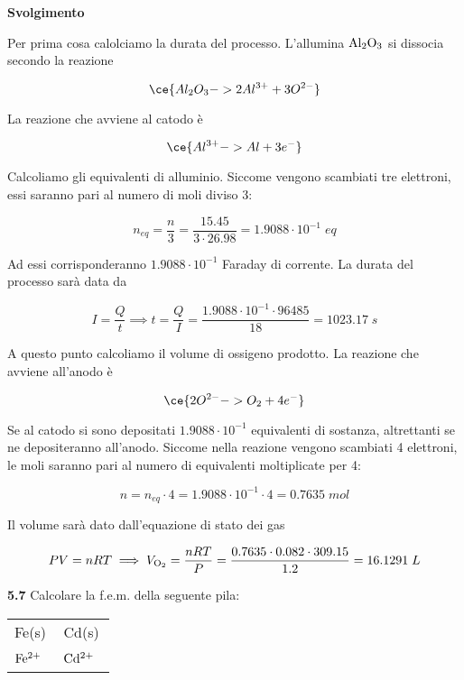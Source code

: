 \vspace{0.2cm}\large\textbf{Svolgimento}\normalsize

\vspace{0.2cm}Per prima cosa calolciamo la durata del processo. L'allumina $\rm Al_2O_3$ si dissocia secondo la reazione 

$$\ce{Al_2O_3 -> 2Al^{3+} + 3O^{2-}}$$

La reazione che avviene al catodo è

$$\ce{Al^{3+} -> Al + 3e^-}$$

Calcoliamo gli equivalenti di alluminio. Siccome vengono scambiati tre elettroni, essi saranno pari al numero di moli diviso 3:

$$n_{eq}=\frac{n}{3}
=\frac{15.45}{3 \cdot 26.98}
=1.9088 \cdot 10^{-1}\;eq$$

Ad essi corrisponderanno $1.9088 \cdot 10^{-1}$ Faraday di corrente. La durata del processo sarà data da

$$I=\frac{Q}{t}
\implies
t=\frac{Q}{I}=\frac{1.9088 \cdot 10^{-1} \cdot 96485}{18}
=1023.17\;s$$

A questo punto calcoliamo il volume di ossigeno prodotto. La reazione che avviene all'anodo è

$$\ce{2O^{2-} -> O_2 + 4e^-}$$

Se al catodo si sono depositati $1.9088 \cdot 10^{-1}$ equivalenti di sostanza, altrettanti se ne depositeranno all'anodo. Siccome nella reazione vengono scambiati 4 elettroni, le moli saranno pari al numero di equivalenti moltiplicate per 4:

$$n=n_{eq} \cdot 4
=1.9088 \cdot 10^{-1} \cdot 4
=0.7635\;mol$$

Il volume sarà dato dall'equazione di stato dei gas

$$PV=nRT
\implies
V_{\rm O_2}=\frac{nRT}{P}=\frac{0.7635 \cdot 0.082 \cdot 309.15}{1.2}=16.1291 \;L$$

\vspace{0.2cm}\textbf{5.7} Calcolare la f.e.m. della seguente pila:

\begin{center}
    \begin{tabular}{|p{3.7cm}||p{3.7cm}|}
         Fe(s) & Cd(s)\\[0.5ex]
         $\rm Fe^{2+}$ \, \big[0.0120 M\big] & $\rm Cd^{2+}$ \, \big[0.8988 M\big] \\[0.5ex]
    \end{tabular}
\end{center}

